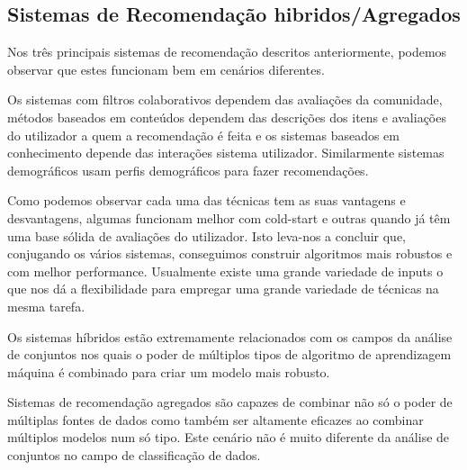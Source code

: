 \subsection{Sistemas de Recomendação hibridos/Agregados}
\hfill
 \par Nos três principais sistemas de recomendação descritos anteriormente, podemos observar que estes funcionam bem em cenários diferentes. 
 \par Os sistemas com filtros colaborativos dependem das avaliações da comunidade, métodos baseados em conteúdos dependem das descrições dos itens e avaliações do utilizador a quem a recomendação é feita e os sistemas baseados em conhecimento depende das interações sistema utilizador. Similarmente sistemas demográficos usam perfis demográficos para fazer recomendações.
 \par Como podemos observar cada uma das técnicas tem as suas vantagens e desvantagens, algumas funcionam melhor com cold-start e outras quando já têm uma base sólida de avaliações do utilizador. Isto leva-nos a concluir que, conjugando os vários sistemas, conseguimos construir algoritmos mais robustos e com melhor performance. Usualmente existe uma grande variedade de inputs o que nos dá a flexibilidade para empregar uma grande variedade de técnicas na mesma tarefa.
 \par Os sistemas híbridos estão extremamente relacionados com os campos da análise de conjuntos nos quais o poder de múltiplos tipos de algoritmo de aprendizagem máquina é combinado para criar um modelo mais robusto.
 \par Sistemas de recomendação agregados são capazes de combinar não só o poder de múltiplas fontes de dados como também ser altamente eficazes ao combinar múltiplos modelos num só tipo. Este cenário não é muito diferente da análise de conjuntos no campo de classificação de dados.

